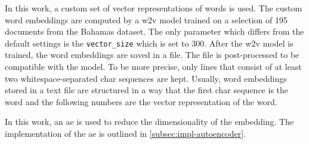 In this work, a custom set of vector representations of words is used.
The custom word embeddings are computed by a \ac{w2v} model trained on a selection of 195 documents from the Bahamas dataset.
The only parameter which differs from the default settings is the \texttt{vector\_size} which is set to 300.
After the \ac{w2v} model is trained, the word embeddings are saved in a file.
The file is post-processed to be compatible with the \infersent{} model.
To be more precise, only lines that consist of at least two whitespace-separated char sequences are kept.
Usually, word embeddings stored in a text file are structured in a way that 
the first char sequence is the word and the following numbers are the vector representation of the word.

In this work, an \ac{ae} is used to reduce the dimensionality of the \infersent{} embedding.
The implementation of the \ac{ae} is outlined in \autoref{subsec:impl-autoencoder}.
